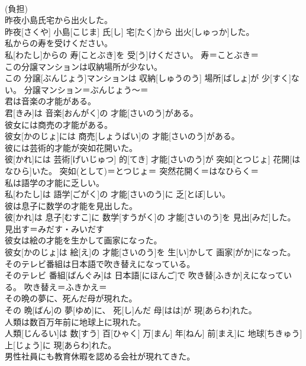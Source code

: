\documentclass[8pt]{extreport}
\begin{document}
\begin{CJK}{UTF8}{min}
{\\	(負担) 
\\	昨夜小島氏宅から出火した。	
\\	昨夜[さくや] 小島[こじま] 氏[し] 宅[たく]から 出火[しゅっか]した。	
\\	私からの寿を受けください。	
\\	私[わたし]からの 寿[ことぶき]を 受[う]けください。	寿＝ことぶき＝ 
\\	この分譲マンションは収納場所が少ない。	
\\	この 分譲[ぶんじょう]マンションは 収納[しゅうのう] 場所[ばしょ]が 少[すく]ない。	分譲マンション＝ぶんじょう〜＝ 
\\	君は音楽の才能がある。	
\\	君[きみ]は 音楽[おんがく]の 才能[さいのう]がある。	
\\	彼女には商売の才能がある。	
\\	彼女[かのじょ]には 商売[しょうばい]の 才能[さいのう]がある。	
\\	彼には芸術的才能が突如花開いた。	
\\	彼[かれ]には 芸術[げいじゅつ] 的[てき] 才能[さいのう]が 突如[とつじょ] 花開[はなひら]いた。	突如(として)＝とつじょ＝ 突然花開く＝はなひらく＝ 
\\	私は語学の才能に乏しい。	
\\	私[わたし]は 語学[ごがく]の 才能[さいのう]に 乏[とぼ]しい。	
\\	彼は息子に数学の才能を見出した。	
\\	彼[かれ]は 息子[むすこ]に 数学[すうがく]の 才能[さいのう]を 見出[みだ]した。	見出す＝みだす・みいだす
\\	彼女は絵の才能を生かして画家になった。	
\\	彼女[かのじょ]は 絵[え]の 才能[さいのう]を 生[い]かして 画家[がか]になった。	
\\	そのテレビ番組は日本語で吹き替えになっている。	
\\	そのテレビ 番組[ばんぐみ]は 日本語[にほんご]で 吹き替[ふきか]えになっている。	吹き替え＝ふきかえ＝ 
\\	その晩の夢に、死んだ母が現れた。	
\\	その 晩[ばん]の 夢[ゆめ]に、 死[し]んだ 母[はは]が 現[あらわ]れた。	
\\	人類は数百万年前に地球上に現れた。	
\\	人類[じんるい]は 数[すう] 百[ひゃく] 万[まん] 年[ねん] 前[まえ]に 地球[ちきゅう] 上[じょう]に 現[あらわ]れた。	
\\	男性社員にも教育休暇を認める会社が現れてきた。	
}
\end{CJK}
\end{document}
